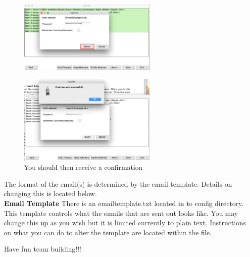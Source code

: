 \documentclass[10pt]{article}
\begin{document}
\begin{enumerate}
\begin{figure}[h]
\includegraphics[width=0.6\textwidth]{pic23}
\end{figure}
\begin{figure}[h]
\caption{You should then receive a confirmation}
\centering
\includegraphics[width=0.6\textwidth]{pic24}
\end{figure}
The format of the email(s) is determined by the email template. Details on changing this is located below.
\\
\newline
\large
\textbf{Email Template}
\normalsize
\newline
There is an emailtemplate.txt located in to config directory. This template controls what the emails that are sent out looks like. You may change this up as you wish but it is limited currently to plain text. Instructions on what you can do to alter the template are located within the file.\\
\newline

\LARGE
Have fun team building!!!
\normalsize
\end{enumerate}
\end{document}
